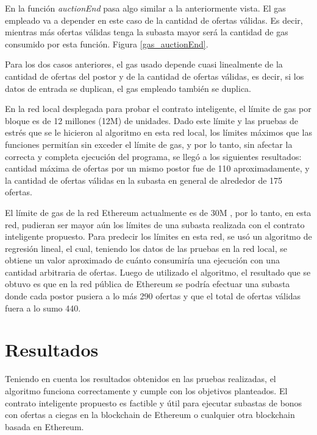       En la función \textit{auctionEnd} pasa algo similar a la anteriormente vista. El gas empleado va a 
      depender en este caso de la cantidad de ofertas válidas. Es decir, mientras más ofertas válidas tenga 
      la subasta mayor será la cantidad de gas consumido por esta función. Figura \ref{gas_auctionEnd}.


      Para los dos casos anteriores, el gas usado depende cuasi linealmente de la cantidad de ofertas del 
      postor y de la cantidad de ofertas válidas, es decir, si los datos de entrada se duplican, el gas 
      empleado también se duplica.


      En la red local desplegada para probar el contrato inteligente, el límite de gas por bloque es de 
      12 millones (12M) de unidades. Dado este límite y las pruebas de estrés que se le hicieron al 
      algoritmo en esta red local, los límites máximos que las funciones permitían sin exceder el límite
      de gas, y por lo tanto, sin afectar la correcta y completa ejecución del programa, se llegó a los
      siguientes resultados: cantidad máxima de ofertas por un mismo postor fue de 110 aproximadamente,
      y la cantidad de ofertas válidas en la subasta en general de alrededor de 175 ofertas.


      El límite de gas de la red Ethereum actualmente es de 30M \parencite{ycharts}, por lo tanto, en esta red, pudieran ser mayor aún los límites de una subasta realizada con el contrato inteligente propuesto.
      Para predecir los límites en esta red, se usó un algoritmo de regresión lineal, el cual, teniendo 
      los datos de las pruebas en la red local, se obtiene un valor aproximado de cuánto consumiría una 
      ejecución con una cantidad arbitraria de ofertas. Luego de utilizado el algoritmo, el resultado que 
      se obtuvo es que en la red pública de Ethereum se podría efectuar una subasta donde cada postor 
      pusiera a lo más 290 ofertas y que el total de ofertas válidas fuera a lo sumo 440.

  \section{Resultados}
    Teniendo en cuenta los resultados obtenidos en las pruebas realizadas, el algoritmo funciona 
    correctamente y cumple con los objetivos planteados. El contrato inteligente propuesto es factible y 
    útil para ejecutar
    subastas de bonos con ofertas a ciegas en la blockchain de Ethereum o cualquier otra blockchain 
    basada en Ethereum.


